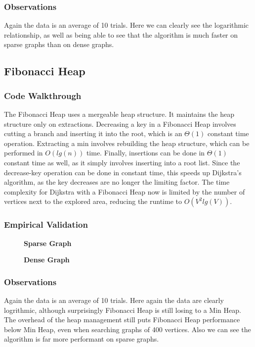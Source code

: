 \documentclass[a4paper,12pt]{article}
\begin{document}
\subsubsection{Observations}
Again the data is an average of 10 trials. Here we can clearly see the logarithmic relationship, as well as being able to see that the algorithm is much faster on sparse graphs than on dense graphs.
\subsection{Fibonacci Heap}
\subsubsection{Code Walkthrough}
The Fibonacci Heap uses a mergeable heap structure. It maintains the heap structure only on extractions. Decreasing a key in a Fibonacci Heap involves cutting a branch and inserting it into the root, which is an $\Theta(1)$ constant time operation. Extracting a min involves rebuilding the heap structure, which can be performed in $O(lg(n))$ time. Finally, insertions can be done in $\Theta(1)$ constant time as well, as it simply involves inserting into a root list. Since the decrease-key operation can be done in constant time, this speeds up Dijkstra's algorithm, as the key decreases are no longer the limiting factor. The time complexity for Dijkstra with a Fibonacci Heap now is limited by the number of vertices next to the explored area, reducing the runtime to $O(V^2lg(V))$.
\subsubsection{Empirical Validation}
\begin{figure}[H]
  \centering
  \textbf{Sparse Graph}\par\medskip
\end{figure}
\begin{figure}[H]
  \centering
  \textbf{Dense Graph}\par\medskip
\end{figure}
\subsubsection{Observations}
Again the data is an average of 10 trials. Here again the data are clearly logrithmic, although surprisingly Fibonacci Heap is still losing to a Min Heap. The overhead of the heap management still puts Fibonacci Heap performance below Min Heap, even when searching graphs of 400 vertices. Also we can see the algorithm is far more performant on sparse graphs.
\end{document}
